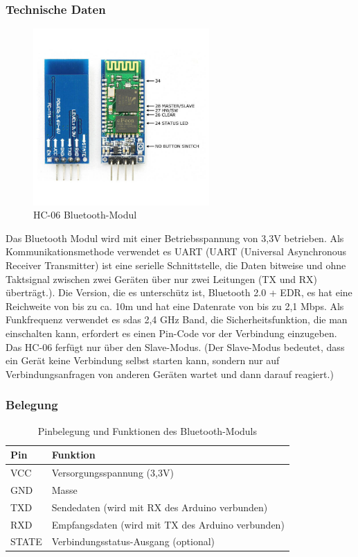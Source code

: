 \subsubsection{Technische Daten}
\begin{figure}[H]
    \centering
    \includegraphics[width=0.6\textwidth]{img/Hardware/hc06.png}
    \caption{HC-06 Bluetooth-Modul}
    \label{fig:hc06}
\end{figure}
Das Bluetooth Modul wird mit einer Betriebsspannung von 3,3V betrieben.
Als Kommunikationsmethode verwendet es UART 
(UART (Universal Asynchronous Receiver Transmitter) ist eine serielle Schnittstelle,
die Daten bitweise und ohne Taktsignal zwischen zwei Geräten über nur zwei Leitungen (TX und RX) überträgt.).
%
Die Version, die es unterschütz ist, Bluetooth 2.0 + EDR, es hat eine Reichweite von bis zu ca. 10m und hat eine Datenrate von bis zu 2,1 Mbps.
%
Als Funkfrequenz verwendet es sdas 2,4 GHz Band, die Sicherheitsfunktion,
die man einschalten kann, erfordert es einen Pin-Code vor der Verbindung einzugeben.
%
Das HC-06 ferfügt nur über den Slave-Modus.
%
(Der Slave-Modus bedeutet, dass ein Gerät keine Verbindung selbst starten kann,
sondern nur auf Verbindungsanfragen von anderen Geräten wartet und dann darauf reagiert.)
\subsubsection{Belegung}
\begin{table}[h]
    \centering
    \begin{tabular}{|l|p{10cm}|}
    \hline
    \textbf{Pin} & \textbf{Funktion} \\
    \hline
    VCC    & Versorgungsspannung (3,3V) \\
    GND    & Masse \\
    TXD    & Sendedaten (wird mit RX des Arduino verbunden) \\
    RXD    & Empfangsdaten (wird mit TX des Arduino verbunden) \\
    STATE  & Verbindungsstatus-Ausgang (optional) \\
    \hline
    \end{tabular}
    \caption{Pinbelegung und Funktionen des Bluetooth-Moduls}
    \end{table}

